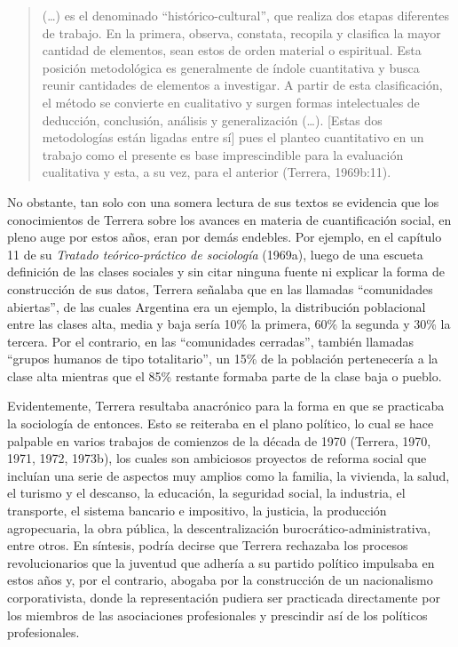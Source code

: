 \begin{quote}
(\dots) es el denominado ``histórico-cultural'', que realiza dos etapas diferentes de trabajo. En la primera, observa, constata, recopila y clasifica la mayor cantidad de elementos, sean estos de orden material o espiritual. Esta posición metodológica es generalmente de índole cuantitativa y busca reunir cantidades de elementos a investigar. A partir de esta clasificación, el método se convierte en cualitativo y surgen formas intelectuales de deducción, conclusión, análisis y generalización (\dots). [Estas dos metodologías están ligadas entre sí] pues el planteo cuantitativo en un trabajo como el presente es base imprescindible para la evaluación cualitativa y esta, a su vez, para el anterior (Terrera, 1969b:11).
\end{quote}

No obstante, tan solo con una somera lectura de sus textos se evidencia que los conocimientos de Terrera sobre los avances en materia de cuantificación social, en pleno auge por estos años, eran por demás endebles. Por ejemplo, en el capítulo 11 de su \emph{Tratado teórico-práctico de sociología} (1969a), luego de una escueta definición de las clases sociales y sin citar ninguna fuente ni explicar la forma de construcción de sus datos, Terrera señalaba que en las llamadas ``comunidades abiertas'', de las cuales Argentina era un ejemplo, la distribución poblacional entre las clases alta, media y baja sería 10\% la primera, 60\% la segunda y 30\% la tercera. Por el contrario, en las ``comunidades cerradas'', también llamadas ``grupos humanos de tipo totalitario'', un 15\% de la población pertenecería a la clase alta mientras que el 85\% restante formaba parte de la clase baja o pueblo.

Evidentemente, Terrera resultaba anacrónico para la forma en que se practicaba la sociología de entonces. Esto se reiteraba en el plano político, lo cual se hace palpable en varios trabajos de comienzos de la década de 1970 (Terrera, 1970, 1971, 1972, 1973b), los cuales son ambiciosos proyectos de reforma social que incluían una serie de aspectos muy amplios como la familia, la vivienda, la salud, el turismo y el descanso, la educación, la seguridad social, la industria, el transporte, el sistema bancario e impositivo, la justicia, la producción agropecuaria, la obra pública, la descentralización burocrático-administrativa, entre otros. En síntesis, podría decirse que Terrera rechazaba los procesos revolucionarios que la juventud que adhería a su partido político impulsaba en estos años y, por el contrario, abogaba por la construcción de un nacionalismo corporativista, donde la representación pudiera ser practicada directamente por los miembros de las asociaciones profesionales y prescindir así de los políticos profesionales.


